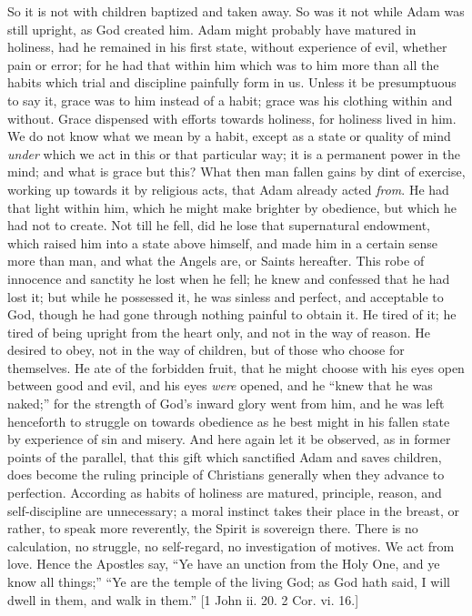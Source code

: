 So it is not with children baptized and taken away. So was it not
while Adam was still upright, as God created him. Adam might probably
have matured in holiness, had he remained in his first state, without
experience of evil, whether pain or error; for he had that within him
which was to him more than all the habits which trial and discipline
painfully form in us. Unless it be presumptuous to say it, grace was
to him instead of a habit; grace was his clothing within and without.
Grace dispensed with efforts towards holiness, for holiness lived in
him. We do not know what we mean by a habit, except as a state or
quality of mind \emph{under} which we act in this or that particular
way; it is a permanent power in the mind; and what is grace but this?
What then man fallen gains by dint of exercise, working up towards it
by religious acts, that Adam already acted \emph{from}. He had that
light within him, which he might make brighter by obedience, but which
he had not to create. Not till he fell, did he lose that supernatural
endowment, which raised him into a state above himself, and made him
in a certain sense more than man, and what the Angels are, or Saints
hereafter. This robe of innocence and sanctity he lost when he fell;
he knew and confessed that he had lost it; but while he possessed it,
he was sinless and perfect, and acceptable to God, though he had gone
through nothing painful to obtain it. He tired of it; he tired of
being upright from the heart only, and not in the way of reason. He
desired to obey, not in the way of children, but of those who choose
for themselves. He ate of the forbidden fruit, that he might choose
with his eyes open between good and evil, and his eyes \emph{were}
opened, and he ``knew that he was naked;'' for the strength of
God's inward glory went from him, and he was left henceforth to
struggle on towards obedience as he best might in his fallen state by
experience of sin and misery. And here again let it be observed, as in
former points of the parallel, that this gift which sanctified Adam
and saves children, does become the ruling principle of Christians
generally when they advance to perfection. According as habits of
holiness are matured, principle, reason, and self-discipline are
unnecessary; a moral instinct takes their place in the breast, or
rather, to speak more reverently, the Spirit is sovereign there. There
is no calculation, no struggle, no self-regard, no investigation of
motives. We act from love. Hence the Apostles say, ``Ye have an
unction from the Holy One, and ye know all things;'' ``Ye are
the temple of the living God; as God hath said, I will dwell in them,
and walk in them.'' [1 John ii. 20. 2 Cor. vi. 16.]

